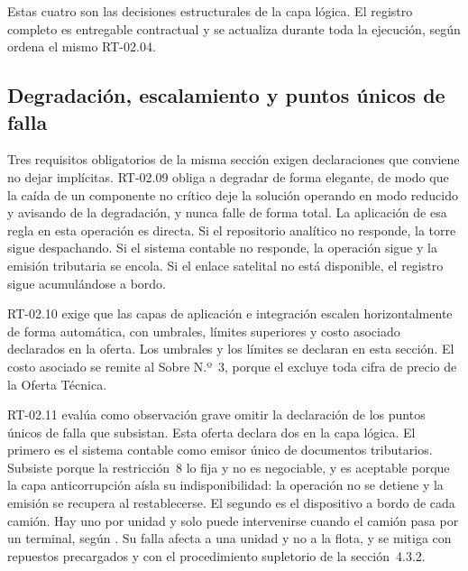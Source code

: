 Estas cuatro son las decisiones estructurales de la capa lógica. El registro completo es entregable
contractual y se actualiza durante toda la ejecución, según ordena el mismo RT-02.04.


\subsection{Degradación, escalamiento y puntos únicos de falla}\label{sec:4-degradacion}

Tres requisitos obligatorios de la misma sección exigen declaraciones que conviene no dejar
implícitas. RT-02.09 obliga a degradar de forma elegante, de modo que la caída de un componente no
crítico deje la solución operando en modo reducido y avisando de la degradación, y nunca falle de
forma total. La aplicación de esa regla en esta operación es directa. Si el repositorio analítico no
responde, la torre sigue despachando. Si el sistema contable no responde, la operación sigue y la
emisión tributaria se encola. Si el enlace satelital no está disponible, el registro sigue
acumulándose a bordo.

RT-02.10 exige que las capas de aplicación e integración escalen horizontalmente de forma automática,
con umbrales, límites superiores y costo asociado declarados en la oferta. Los umbrales y los límites
se declaran en esta sección. El costo asociado se remite al Sobre N.º~3, porque el 
excluye toda cifra de precio de la Oferta Técnica.

RT-02.11 evalúa como observación grave omitir la declaración de los puntos únicos de falla que
subsistan. Esta oferta declara dos en la capa lógica. El primero es el sistema contable como emisor único de
documentos tributarios. Subsiste porque la restricción~8 lo fija y no es negociable, y es aceptable
porque la capa anticorrupción aísla su indisponibilidad: la operación no se detiene y la emisión se
recupera al restablecerse. El segundo es el dispositivo a bordo de cada camión. Hay uno por unidad y
solo puede intervenirse cuando el camión pasa por un terminal, según . Su falla
afecta a una unidad y no a la flota, y se mitiga con repuestos precargados y con el procedimiento
supletorio de la sección~4.3.2.


